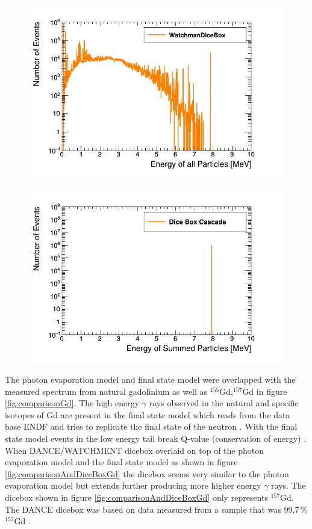 \begin{figure}[htbp]
 \centering
 \includegraphics[width=0.7\linewidth]{Chapter4/Figs/Raster/gadolinium/energyOfCascadeOfCascadeGd.png}
 \label{fig:energyOfCascadeOfCascadeGd}
\end{figure}

\begin{figure}[htbp]
 \centering
 \includegraphics[width=0.7\linewidth]{Chapter4/Figs/Raster/gadolinium/conservationOfCascadeGd.png}
 \label{fig:conservationOfCascadeGd}
\end{figure}

The photon evaporation model and final state model were overlapped with the measured spectrum from natural gadolinium as well as $^{155}$Gd,$^{157}$Gd in figure \ref{fig:comparisonGd}. The high energy $\gamma$ rays observed in the natural and specific isotopes of Gd are present in the final state model which reads from the data base ENDF and tries to replicate the final state of the neutron \cite{koiTatsumi_2006}. With the final state model events in the low energy tail break Q-value (conservation of energy) \cite{YuChen_2015}. When DANCE/WATCHMENT dicebox overlaid on top of the photon evaporation model and the final state model as shown in figure  \ref{fig:comparisonAndDiceBoxGd} the dicebox seems very similar to the photon evaporation model but extends further producing more higher energy $\gamma$ rays. The dicebox shown in figure \ref{fig:comparisonAndDiceBoxGd} only represents $^{157}$Gd. The DANCE dicebox was based on data measured from a sample that was  99.7\,\% $^{157}$Gd \cite{Chyzh_2011}. 

